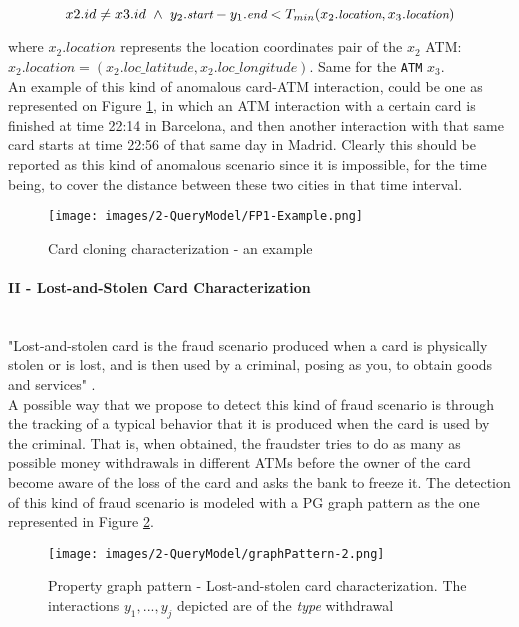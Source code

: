 $$
\small
x2.id \ne x3.id \ \land \ y_2.\textit{start} - y_1.\textit{end} < T_{min}(x_2.\textit{location}, x_3.\textit{location})
$$

where $x_2.\textit{location}$ represents the location coordinates pair of the $x_2$ ATM: $x_2.location = (x_2.loc\_latitude, x_2.loc\_longitude)$. Same for the \texttt{ATM} $x_3$.\\

An example of this kind of anomalous card-ATM interaction, could be one as represented on Figure \ref{img:graphPattern-1-Example}, in which an ATM interaction with a certain card is finished at time 22:14 in Barcelona, and then another interaction with that same card starts at time 22:56 of that same day in Madrid. Clearly this should be reported as this kind of anomalous scenario since it is impossible, for the time being, to cover the distance between these two cities in that time interval.

\begin{figure}[H]
  \centering
  \texttt{[image: images/2-QueryModel/FP1-Example.png]}
  \caption{Card cloning characterization - an example}
  \label{img:graphPattern-1-Example}
\end{figure}

\paragraph{II - Lost-and-Stolen Card Characterization\\\\}

"Lost-and-stolen card is the fraud scenario produced when a card is physically stolen or is lost, and is then used by a criminal, posing as you, to obtain goods and services" \cite{FP-lost-and-stolen-americanexpress2025}.\\

A possible way that we propose to detect this kind of fraud scenario is through the tracking of a typical behavior that it is produced when the card is used by the criminal. That is, when obtained, the fraudster tries to do as many as possible money withdrawals in different ATMs before the owner of the card become aware of the loss of the card and asks the bank to freeze it. The detection of this kind of fraud scenario is modeled with a PG graph pattern as the one represented in Figure \ref{img:graphPattern-2}.

\begin{figure}[H]
  \centering
  \texttt{[image: images/2-QueryModel/graphPattern-2.png]}
  \caption{Property graph pattern - Lost-and-stolen card characterization. The interactions $y_1,...,y_j$ depicted are of the \emph{type} withdrawal}
  \label{img:graphPattern-2}
\end{figure}

